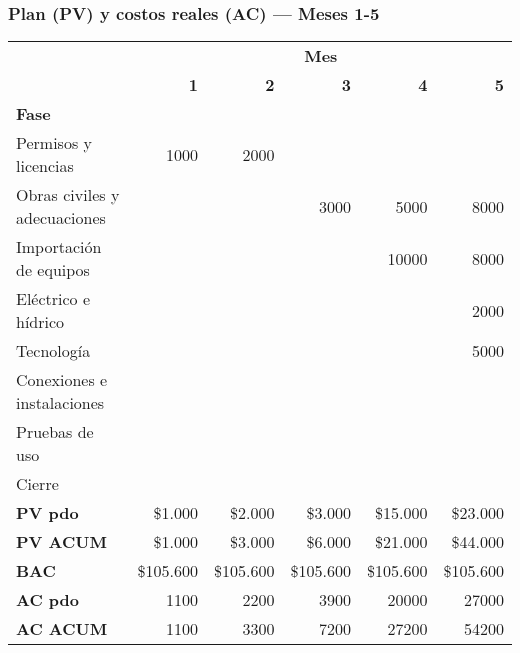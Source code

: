 \subsubsection*{Plan (PV) y costos reales (AC) — Meses 1-5}
\begin{table}[H]\centering\small
\begin{tabular}{lrrrrr}
\toprule
 & \multicolumn{5}{c}{\textbf{Mes}} \\
\cmidrule(lr){2-6}
 & \textbf{1} & \textbf{2} & \textbf{3} & \textbf{4} & \textbf{5} \\
\midrule
\textbf{Fase} & & & & & \\
Permisos y licencias        & 1000 & 2000 &      &       &      \\
Obras civiles y adecuaciones&      &      & 3000 & 5000  & 8000 \\
Importación de equipos      &      &      &      & 10000 & 8000 \\
Eléctrico e hídrico         &      &      &      &       & 2000 \\
Tecnología                  &      &      &      &       & 5000 \\
Conexiones e instalaciones  &      &      &      &       &      \\
Pruebas de uso              &      &      &      &       &      \\
Cierre                      &      &      &      &       &      \\
\midrule
\textbf{PV pdo}  & \$1{.}000 & \$2{.}000 & \$3{.}000 & \$15{.}000 & \$23{.}000 \\
\textbf{PV ACUM} & \$1{.}000 & \$3{.}000 & \$6{.}000 & \$21{.}000 & \$44{.}000 \\
\textbf{BAC}     & \$105{.}600 & \$105{.}600 & \$105{.}600 & \$105{.}600 & \$105{.}600 \\
\midrule
\textbf{AC pdo}  & 1100 & 2200 & 3900 & 20000 & 27000 \\
\textbf{AC ACUM} & 1100 & 3300 & 7200 & 27200 & 54200 \\
\bottomrule
\end{tabular}
\end{table}

